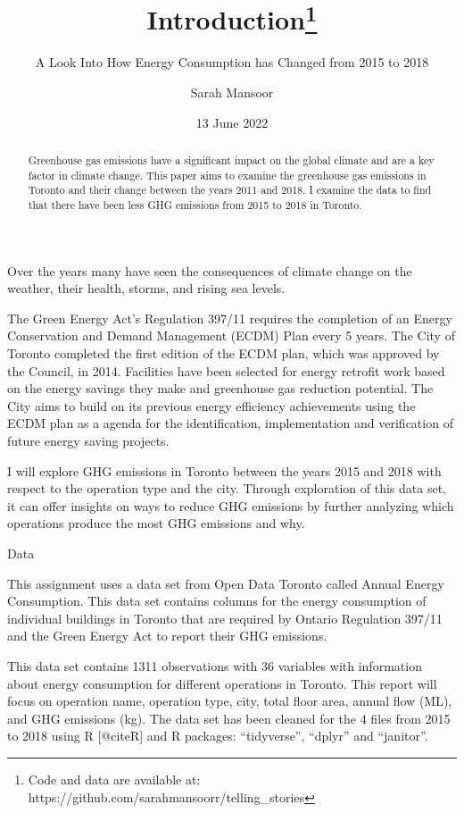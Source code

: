 \documentclass[
  letterpaper,
  DIV=11,
  numbers=noendperiod]{scrartcl}
\title{Introduction\thanks{Code and data are available at:
https://github.com/sarahmansoorr/telling\_stories}}
\subtitle{A Look Into How Energy Consumption has Changed from 2015 to
2018}
\author{Sarah Mansoor}
\date{13 June 2022}
\renewcommand*\contentsname{Table of contents}
\newcommand\contentsname{Table of contents}
\begin{document}
\maketitle
\begin{abstract}
Greenhouse gas emissions have a significant impact on the global climate
and are a key factor in climate change. This paper aims to examine the
greenhouse gas emissions in Toronto and their change between the years
2011 and 2018. I examine the data to find that there have been less GHG
emissions from 2015 to 2018 in Toronto.
\end{abstract}
\ifdefined\Shaded\renewenvironment{Shaded}{\begin{tcolorbox}[interior hidden, borderline west={3pt}{0pt}{shadecolor}, breakable, boxrule=0pt, sharp corners, enhanced, frame hidden]}{\end{tcolorbox}}\fi

\renewcommand*\contentsname{Table of contents}
{
\hypersetup{linkcolor=}
\setcounter{tocdepth}{3}
\tableofcontents
}
Over the years many have seen the consequences of climate change on the
weather, their health, storms, and rising sea levels.

The Green Energy Act's Regulation 397/11 requires the completion of an
Energy Conservation and Demand Management (ECDM) Plan every 5 years. The
City of Toronto completed the first edition of the ECDM plan, which was
approved by the Council, in 2014. Facilities have been selected for
energy retrofit work based on the energy savings they make and
greenhouse gas reduction potential. The City aims to build on its
previous energy efficiency achievements using the ECDM plan as a agenda
for the identification, implementation and verification of future energy
saving projects.

I will explore GHG emissions in Toronto between the years 2015 and 2018
with respect to the operation type and the city. Through exploration of
this data set, it can offer insights on ways to reduce GHG emissions by
further analyzing which operations produce the most GHG emissions and
why.

\pagebreak

Data

This assignment uses a data set from Open Data Toronto called Annual
Energy Consumption. This data set contains columns for the energy
consumption of individual buildings in Toronto that are required by
Ontario Regulation 397/11 and the Green Energy Act to report their GHG
emissions.

This data set contains 1311 observations with 36 variables with
information about energy consumption for different operations in
Toronto. This report will focus on operation name, operation type, city,
total floor area, annual flow (ML), and GHG emissions (kg). The data set
has been cleaned for the 4 files from 2015 to 2018 using R {[}@citeR{]}
and R packages: ``tidyverse'', ``dplyr'' and ``janitor''.
\end{document}
